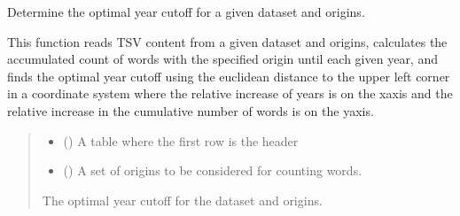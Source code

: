 \documentclass[letterpaper,10pt,english]{sphinxmanual}
\begin{document}

\begin{fulllineitems}
\label{\detokenize{documentation:loanpy.utils.find_optimal_year_cutoff}}
\pysigstartsignatures
{}
\pysigstopsignatures
\sphinxAtStartPar
Determine the optimal year cutoff for a given dataset and origins.

\sphinxAtStartPar
This function reads TSV content from a given dataset and origins,
calculates the accumulated count of words with the specified origin until
each given year, and finds the optimal year cutoff using the euclidean
distance to the upper left corner in a coordinate system where the
relative increase of years is on the x\sphinxhyphen{}axis and the relative increase
in the cumulative number of words is on the y\sphinxhyphen{}axis.
\begin{quote}\begin{description}
\begin{itemize}
\item {} 
\sphinxAtStartPar
{} () \textendash{} A table where the first row is the header

\item {} 
\sphinxAtStartPar
{} () \textendash{} A set of origins to be considered for counting words.

\end{itemize}

\sphinxAtStartPar
The optimal year cutoff for the dataset and origins.


\end{description}
\end{quote}
\end{fulllineitems}
\end{document}
